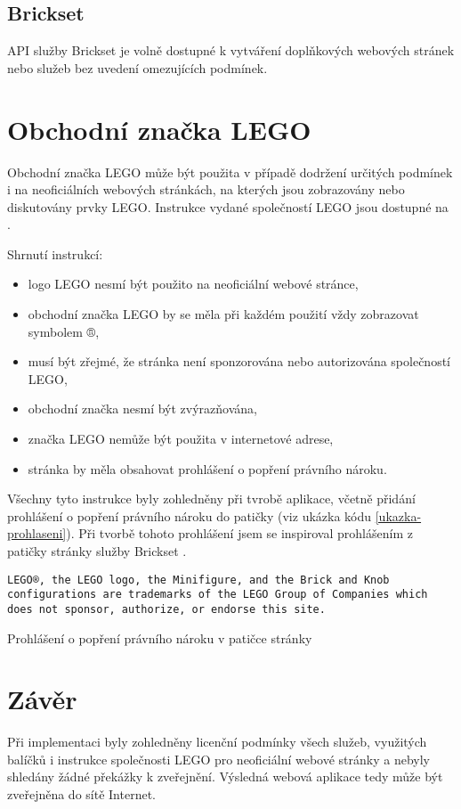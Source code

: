 \subsection{Brickset}
API služby Brickset je volně dostupné k vytváření doplňkových webových stránek nebo služeb bez uvedení omezujících podmínek. \autocite{brickset:key} 

\section{Obchodní značka LEGO}
Obchodní značka LEGO může být použita v případě dodržení určitých podmínek i na neoficiálních webových stránkách, na kterých jsou zobrazovány nebo diskutovány prvky LEGO. Instrukce vydané společností LEGO jsou dostupné na \autocite{lego:fair-play}.

Shrnutí instrukcí: 
\begin{itemize}
        \item logo LEGO nesmí být použito na neoficiální webové stránce,
        \item obchodní značka LEGO by se měla při každém použití vždy zobrazovat symbolem ®,
        \item musí být zřejmé, že stránka není sponzorována nebo autorizována společností LEGO,
        \item obchodní značka nesmí být zvýrazňována,
        \item značka LEGO nemůže být použita v internetové adrese,
        \item stránka by měla obsahovat prohlášení o popření právního nároku.
\end{itemize}

Všechny tyto instrukce byly zohledněny při tvrobě aplikace, včetně přidání prohlášení o popření právního nároku do patičky (viz ukázka kódu \ref{ukazka-prohlaseni}). Při tvorbě tohoto prohlášení jsem se inspiroval prohlášením z patičky stránky služby Brickset \autocite{brickset:about}.

\begin{listing}[htbp]
        \begin{verbatim}
LEGO®, the LEGO logo, the Minifigure, and the Brick and Knob 
configurations are trademarks of the LEGO Group of Companies which
does not sponsor, authorize, or endorse this site.
        \end{verbatim}
    \caption{Prohlášení o popření právního nároku v patičce stránky\label{ukazka-prohlaseni}}
\end{listing}

\section{Závěr}
Při implementaci byly zohledněny licenční podmínky všech služeb, využitých balíčků i instrukce společnosti LEGO pro neoficiální webové stránky a nebyly shledány žádné překážky k zveřejnění. Výsledná webová aplikace tedy může být zveřejněna do sítě Internet.